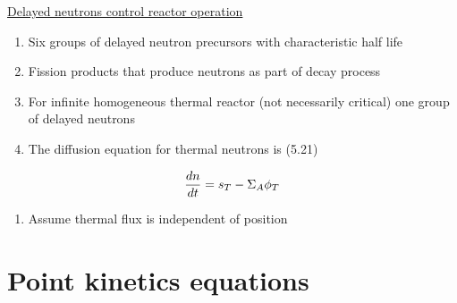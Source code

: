 \documentclass[aspectratio=1610,pdftex,dvipsnames,compress,xcolor={dvipsnames}]{beamer}
\begin{document}
\addtocounter{framenumber}{-1} 
\begin{frame}{\href{https://www.nrc.gov/docs/ML1214/ML12142A098.pdf}{Delayed neutrons control reactor operation}}
    \begin{enumerate}[series=outerlist,topsep=0pt,itemsep=21pt,leftmargin=*,label=(\arabic*)]
        \item[]Six groups of delayed neutron precursors with characteristic half life
        \item[]Fission products that produce neutrons as part of decay process
        \item[]For infinite homogeneous thermal reactor (not necessarily critical) one group of delayed neutrons
        \item[]The diffusion equation for thermal neutrons is (5.21)
    \end{enumerate}

    \vspace*{\fill}

    \begin{equation}
        \LARGE
        \frac{dn}{dt} = s_T - \Sigma_A \phi_T
    \end{equation}

    \vspace*{\fill}

    \begin{enumerate}[series=outerlist,topsep=0pt,itemsep=21pt,leftmargin=*,label=(\arabic*)]
        \item[]Assume thermal flux is independent of position
    \end{enumerate}
\end{frame}


\section{Point kinetics equations}
\end{document}
